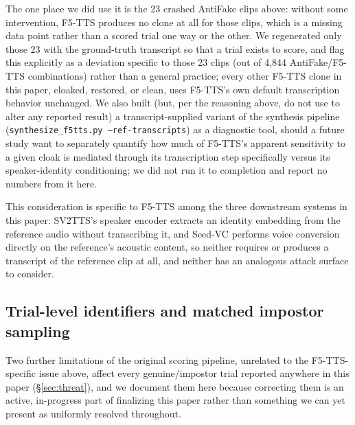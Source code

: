 \documentclass[11pt]{article}
\begin{document}
The one place we did use it is the 23 crashed AntiFake clips above:
without some intervention, F5-TTS produces no clone at all for those
clips, which is a missing data point rather than a scored trial one
way or the other. We regenerated only those 23 with the ground-truth
transcript so that a trial exists to score, and flag this explicitly
as a deviation specific to those 23 clips (out of 4,844 AntiFake/F5-TTS
combinations) rather than a general practice; every other F5-TTS clone
in this paper, cloaked, restored, or clean, uses F5-TTS's own default
transcription behavior unchanged. We also built (but, per the
reasoning above, do not use to alter any reported result) a
transcript-supplied variant of the synthesis pipeline
(\texttt{synthesize\_f5tts.py --ref-transcripts}) as a diagnostic tool,
should a future study want to separately quantify how much of F5-TTS's
apparent sensitivity to a given cloak is mediated through its
transcription step specifically versus its speaker-identity
conditioning; we did not run it to completion and report no numbers
from it here.

This consideration is specific to F5-TTS among the three downstream
systems in this paper: SV2TTS's speaker encoder extracts an identity
embedding from the reference audio without transcribing it, and
Seed-VC performs voice conversion directly on the reference's acoustic
content, so neither requires or produces a transcript of the reference
clip at all, and neither has an analogous attack surface to consider.

\subsection{Trial-level identifiers and matched impostor sampling}
\label{sec:ablation-trial-ids}

Two further limitations of the original scoring pipeline, unrelated to
the F5-TTS-specific issue above, affect every genuine/impostor trial
reported anywhere in this paper (\S\ref{sec:threat}), and we document
them here because correcting them is an active, in-progress part of
finalizing this paper rather than something we can yet present as
uniformly resolved throughout.
\end{document}
